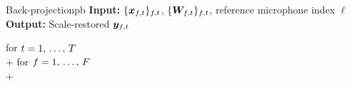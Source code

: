 \documentclass[sip,biber]{now-journal}
\begin{document}
\begin{algorithm}{Back-projection}{pb}
  \textbf{Input:} $\{\Obs _{\ft}\} _{\ft}$, $\{\Demix _{\ft}\} _{\ft}$, reference microphone index $\ell$\\
  \textbf{Output:} Scale-restored $\Est _{\ft}$
  \begin{pseudo}
    for $t = 1,\, \dots,\, T$ \\+
      for $f = 1,\, \dots,\, F$ \\+
         \\
  \end{pseudo}
\end{algorithm}
\end{document}
